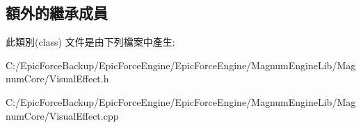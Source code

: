 \subsection*{額外的繼承成員}


此類別(class) 文件是由下列檔案中產生\+:\begin{DoxyCompactItemize}
\item 
C\+:/\+Epic\+Force\+Backup/\+Epic\+Force\+Engine/\+Epic\+Force\+Engine/\+Magnum\+Engine\+Lib/\+Magnum\+Core/Visual\+Effect.\+h\item 
C\+:/\+Epic\+Force\+Backup/\+Epic\+Force\+Engine/\+Epic\+Force\+Engine/\+Magnum\+Engine\+Lib/\+Magnum\+Core/Visual\+Effect.\+cpp\end{DoxyCompactItemize}
